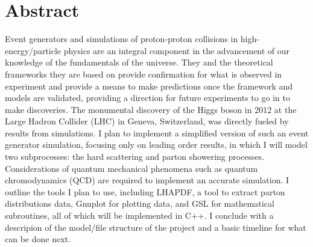 \section*{Abstract}

Event generators and simulations of proton-proton collisions in high-energy/particle physics are an integral component in the advancement of our knowledge of the fundamentals of the universe. They and the theoretical frameworks they are based on provide confirmation for what is observed in experiment and provide a means to make predictions once the framework and models are validated, providing a direction for future experiments to go in to make discoveries. The monumental discovery of the Higgs boson in 2012 at the Large Hadron Collider (LHC) in Geneva, Switzerland, was directly fueled by results from simulations. I plan to implement a simplified version of such an event generator simulation, focusing only on leading order results, in which I will model two subprocesses: the hard scattering and parton showering processes. Considerations of quantum mechanical phenomena such as quantum chromodynamics (QCD) are required to implement an accurate simulation. I outline the tools I plan to use, including \textsc{LHAPDF}, a tool to extract parton distributions data, Gnuplot for plotting data, and GSL for mathematical subroutines, all of which will be implemented in C++. I conclude with a descripion of the model/file structure of the project and a basic timeline for what can be done next.

